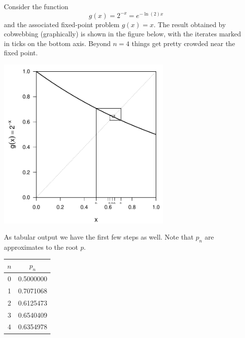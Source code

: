 \documentclass[11pt]{article}
\begin{document}
Consider the function \[g(x) = 2^{-x} = e^{-\ln(2)x}\] and the associated fixed-point problem \(g(x) = x\). The result obtained by cobwebbing (graphically) is shown in the figure below, with the iterates marked in ticks on the bottom axis.  Beyond \(n=4\) things get pretty crowded near the fixed point.
%
\begin{center}
\includegraphics[width=0.65\textwidth]{fixedpoint.pdf}
\end{center}
%
As tabular output we have the first few steps as well. Note that \(p_n\) are approximates to the root \(p\).
\begin{center}
\begin{tabular}{cc}
\(n\) & \(p_n\)\\
\hline\hline
0 & 0.5000000\\
1 & 0.7071068\\
2 & 0.6125473\\
3 & 0.6540409\\
4 & 0.6354978
\end{tabular}
\end{center}
%
%
\end{document}
